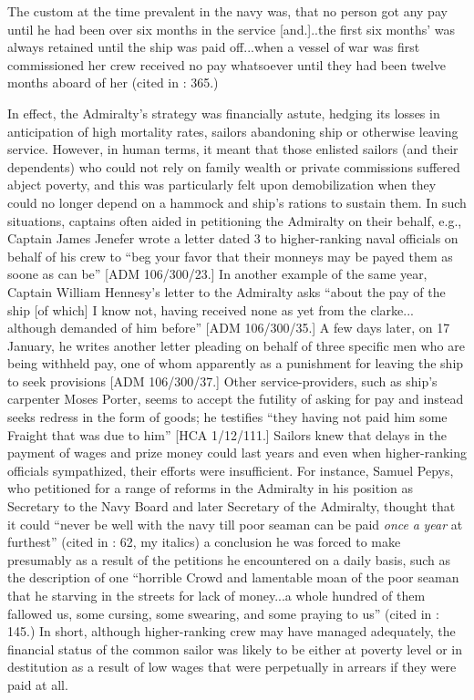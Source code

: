 The custom at the time prevalent in the navy was, that no person got any pay until he had been over six months in the service [and.]..the first six months’ was always retained until the ship was paid off...when a vessel of war was first commissioned her crew received no pay whatsoever until they had been twelve months aboard of her (cited in \citealt{AdkinsAdkins2008}: 365.)

In effect, the Admiralty’s strategy was financially astute, hedging its losses in anticipation of high mortality rates, sailors abandoning ship or otherwise leaving service. However, in human terms, it meant that those enlisted sailors (and their dependents) who could not rely on family wealth or private commissions suffered abject poverty, and this was particularly felt upon demobilization when they could no longer depend on a hammock and ship’s rations to sustain them. In such situations, captains often aided in petitioning the Admiralty on their behalf, e.g., Captain James Jenefer wrote a letter dated 3 \citealt{June1674} to higher-ranking naval officials on behalf of his crew to “beg your favor that their monneys may be payed them as soone as can be” [ADM 106/300/23.] In another example of the same year, Captain William Hennesy’s letter to the Admiralty asks “about the pay of the ship [of which] I know not, having received none as yet from the clarke... although demanded of him before” [ADM 106/300/35.] A few days later, on 17 January, he writes another letter pleading on behalf of three specific men who are being withheld pay, one of whom apparently as a punishment for leaving the ship to seek provisions [ADM 106/300/37.] Other service-providers, such as ship’s carpenter Moses Porter, seems to accept the futility of asking for pay and instead seeks redress in the form of goods; he testifies “they having not paid him some Fraight that was due to him” [HCA 1/12/111.] Sailors knew that delays in the payment of wages and prize money could last years and even when higher-ranking officials sympathized, their efforts were insufficient. For instance, Samuel Pepys, who petitioned for a range of reforms in the Admiralty in his position as Secretary to the Navy Board and later Secretary of the Admiralty, thought that it could  “never be well with the navy till poor seaman can be paid \textit{once} \textit{a} \textit{year} at furthest” (cited in \citealt{Palmer1986}: 62, my italics) a conclusion he was forced to make presumably as a result of the petitions he encountered on a daily basis, such as the description of one “horrible Crowd and lamentable moan of the poor seaman that he starving in the streets for lack of money...a whole hundred of them fallowed us, some cursing, some swearing, and some praying to us” (cited in \citealt{Lincoln2015}: 145.) In short, although higher-ranking crew may have managed adequately, the financial status of the common sailor was likely to be either at poverty level or in destitution as a result of low wages that were perpetually in arrears if they were paid at all.  

